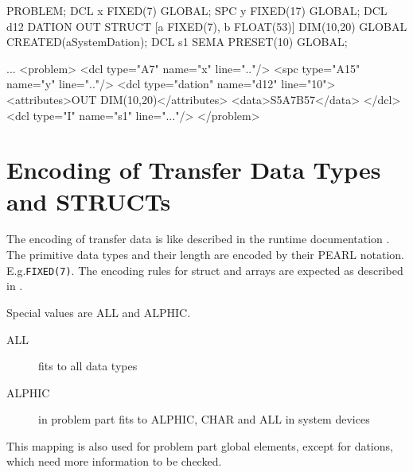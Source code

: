 \begin{PEARLCode}
PROBLEM;
   DCL x FIXED(7) GLOBAL;
   SPC y FIXED(17) GLOBAL;
   DCL d12 DATION OUT STRUCT [a FIXED(7), b FLOAT(53)]
     DIM(10,20)  GLOBAL CREATED(aSystemDation);
   DCL s1 SEMA PRESET(10) GLOBAL;
\end{PEARLCode}

\begin{XMLCode}
...
<problem>
  <dcl type="A7" name="x" line=".."/>
  <spc type="A15" name="y" line=".."/>
  <dcl type="dation" name="d12" line="10">
    <attributes>OUT DIM(10,20)</attributes>
    <data>S5A7B57</data>
  </dcl>
  <dcl type="I" name="s1" line="..."/>
</problem>
\end{XMLCode}


\section{Encoding of Transfer Data Types and STRUCTs}
\label{encoding}
The encoding of transfer data is like described in the runtime documentation
\cite{runtime}. The primitive data types and their length are encoded 
by their PEARL notation.  E.g.\verb|FIXED(7)|. The encoding rules
for struct and arrays are expected as described in \cite{runtime}. 

Special values are ALL and ALPHIC.

\begin{description}
\item[ALL] fits to all data types
\item[ALPHIC] in problem part fits to ALPHIC, CHAR and ALL in system devices
\end{description}

This mapping is also used for problem part global elements, except for dations,
which need more information to be checked.
